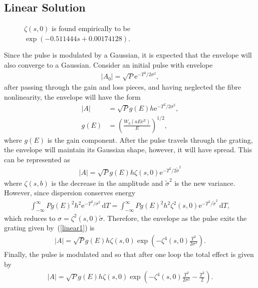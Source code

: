 \documentclass[12pt]{article}
\providecommand{\df}{\textrm{d}}
\begin{document}
\subsection{Linear Solution}
\begin{wrapfigure}{r}{0.45\textwidth}
\centering
{}
\caption{$\zeta(s, 0)$ is found empirically to be $\exp(-0.511444s + 0.00174128)$.}
\label{fig:zeta}
\end{wrapfigure}

Since the pulse is modulated by a Gaussian, it is expected that the envelope will also converge to a Gaussian. Consider an initial pulse with envelope
\begin{align*}
	|A_0| = \sqrt{P} \textrm{e}^{-T^2 / 2 \sigma^2},
\end{align*}
after passing through the gain and loss pieces, and having neglected the fibre nonlinearity, the envelope will have the form
\begin{align*}
	|A| &= \sqrt{P} g(E) h \textrm{e}^{-T^2 / 2 \sigma^2}, \\
	g(E) &= \left( \frac{W_0(a E \textrm{e}^E)}{E} \right)^{1/2},
\end{align*}
where $g(E)$ is the gain component. After the pulse travels through the grating, the envelope will maintain its Gaussian shape, however, it will have spread. This can be represented as
\begin{align}
\label{linear1}
	|A| = \sqrt{P} g(E) h \zeta(s, 0) \textrm{e}^{-T^2 / 2 \tilde{\sigma}^2}
\end{align}
where $\zeta(s, b)$ is the decrease in the amplitude and $\widetilde{\sigma}^2$ is the new variance. However, since dispersion conserves energy
\begin{align*}
	\int_{-\infty}^{\infty} P g(E)^2 h^2 \textrm{e}^{-T^2 / \sigma^2} \, \df T = 
	\int_{-\infty}^{\infty} P g(E)^2 h^2 \zeta^2(s, 0) \textrm{e}^{-T^2 / \widetilde{\sigma}^2} \, \df T,
\end{align*}
which reduces to $\sigma = \zeta^2(s, 0) \widetilde{\sigma}$. Therefore, the envelope as the pulse exits the grating given by~(\ref{linear1}) is
\begin{align*}
	|A| = \sqrt{P} g(E) h \zeta(s, 0) \exp \left( -\zeta^4(s, 0) \frac{T^2}{2 \sigma^2} \right).
\end{align*}
Finally, the pulse is modulated and so that after one loop the total effect is given by
\begin{align}
\label{linear2}
	|A| = \sqrt{P} g(E) h \zeta(s, 0) \exp \left( -\zeta^4(s, 0) \frac{T^2}{2 \sigma^2} - \frac{T^2}{2} \right).
\end{align}
\end{document}
